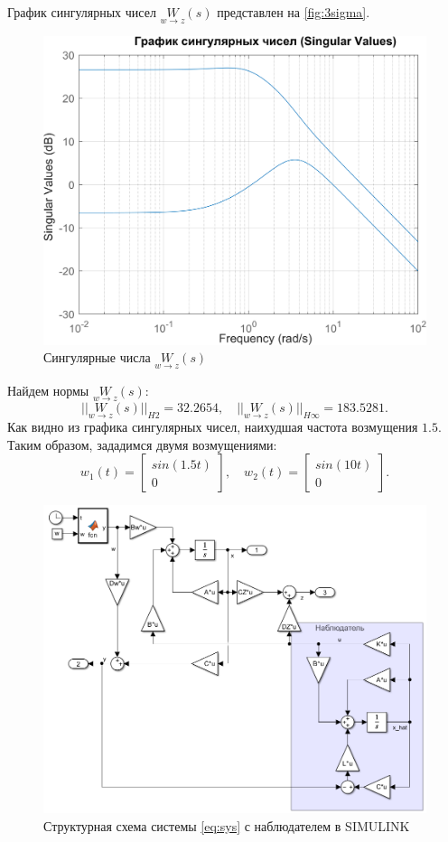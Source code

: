График сингулярных чисел $\underset{w\rightarrow z}{W}(s)$ представлен на \autoref{fig:3sigma}.
\begin{figure}[H]
    \centering
    \includegraphics[width=0.7\linewidth]{figs/3_sigma.png}
    \caption{Сингулярные числа $\underset{w\rightarrow z}{W}(s)$}
    \label{fig:3sigma}
\end{figure}
\noindent Найдем нормы $\underset{w\rightarrow z}{W}(s)$:
\begin{equation*}
    ||\underset{w\rightarrow z}{W}(s)||_{H2}=32.2654,\quad
    ||\underset{w\rightarrow z}{W}(s)||_{H\infty}=183.5281.
\end{equation*}
Как видно из графика сингулярных чисел, наихудшая частота возмущения $1.5$.
Таким образом, зададимся двумя возмущениями:
\begin{equation*}
    w_1(t)=\begin{bmatrix}
        sin(1.5t)\\
        0
    \end{bmatrix},\quad
    w_2(t)=\begin{bmatrix}
        sin(10t)\\
        0
    \end{bmatrix}.
\end{equation*}
\begin{figure}[H]
    \centering
    \includegraphics[width=1\linewidth]{figs/3_slx.png}
    \caption{Структурная схема системы \eqref{eq:sys} с наблюдателем в SIMULINK}
    \label{fig:3slx}
\end{figure}
